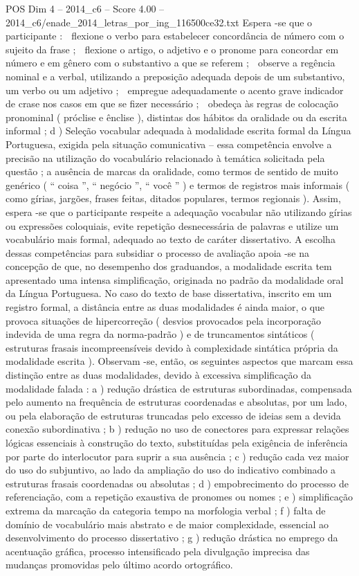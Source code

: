 \begin{textsample}{POS Dim 4 – 2014\_c6 – Score 4.00 – 2014\_c6/enade\_2014\_letras\_por\_ing\_116500ce32.txt}
Espera -se que o participante :  flexione o verbo para estabelecer concordância de número com o sujeito da frase ;  flexione o artigo, o adjetivo e o pronome para concordar em número e em gênero com o substantivo a que se referem ;  observe a regência nominal e a verbal, utilizando a preposição adequada depois de um substantivo, um verbo ou um adjetivo ;  empregue adequadamente o acento grave indicador de crase nos casos em que se fizer necessário ;  obedeça às regras de colocação pronominal ( próclise e ênclise ), distintas dos hábitos da oralidade ou da escrita informal ; d ) Seleção vocabular adequada à modalidade escrita formal da Língua Portuguesa, exigida pela situação comunicativa – essa competência envolve a precisão na utilização do vocabulário relacionado à temática solicitada pela questão ; a ausência de marcas da oralidade, como termos de sentido de muito genérico ( “ coisa ”, “ negócio ”, “ você ” ) e termos de registros mais informais ( como gírias, jargões, frases feitas, ditados populares, termos regionais ).
Assim, espera -se que o participante respeite a adequação vocabular não utilizando gírias ou expressões coloquiais, evite repetição desnecessária de palavras e utilize um vocabulário mais formal, adequado ao texto de caráter dissertativo.
A escolha dessas competências para subsidiar o processo de avaliação apoia -se na concepção de que, no desempenho dos graduandos, a modalidade escrita tem apresentado uma intensa simplificação, originada no padrão da modalidade oral da Língua Portuguesa.
No caso do texto de base dissertativa, inscrito em um registro formal, a distância entre as duas modalidades é ainda maior, o que provoca situações de hipercorreção ( desvios provocados pela incorporação indevida de uma regra da norma-padrão ) e de truncamentos sintáticos ( estruturas frasais incompreensíveis devido à complexidade sintática própria da modalidade escrita ).
Observam -se, então, os seguintes aspectos que marcam essa distinção entre as duas modalidades, devido à excessiva simplificação da modalidade falada : a ) redução drástica de estruturas subordinadas, compensada pelo aumento na frequência de estruturas coordenadas e absolutas, por um lado, ou pela elaboração de estruturas truncadas pelo excesso de ideias sem a devida conexão subordinativa ; b ) redução no uso de conectores para expressar relações lógicas essenciais à construção do texto, substituídas pela exigência de inferência por parte do interlocutor para suprir a sua ausência ; c ) redução cada vez maior do uso do subjuntivo, ao lado da ampliação do uso do indicativo combinado a estruturas frasais coordenadas ou absolutas ; d ) empobrecimento do processo de referenciação, com a repetição exaustiva de pronomes ou nomes ; e ) simplificação extrema da marcação da categoria tempo na morfologia verbal ; f ) falta de domínio de vocabulário mais abstrato e de maior complexidade, essencial ao desenvolvimento do processo dissertativo ; g ) redução drástica no emprego da acentuação gráfica, processo intensificado pela divulgação imprecisa das mudanças promovidas pelo último acordo ortográfico.

\end{textsample}
